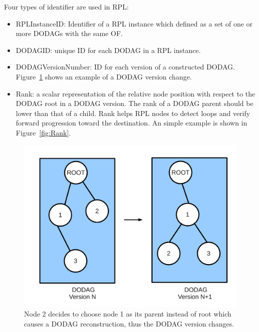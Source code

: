 Four types of identifier are used in RPL:
\begin{itemize}
\item RPLInstanceID: Identifier of a RPL instance which defined as a set of one or more DODAGs with the same OF.


\item DODAGID: unique ID for each DODAG in a RPL instance.


\item DODAGVersionNumber: ID for each version of a constructed DODAG. Figure~\ref{fig:DODAGVersion} shows an example of a DODAG version change.

\item Rank: a scalar representation of the relative node position with respect to the DODAG root in a DODAG version. 
The rank of a DODAG parent should be lower than that of a child. Rank helps RPL nodes to detect loops and verify forward progression toward the destination. An simple example is shown in Figure~\ref{fig:Rank}.
\end{itemize}

\begin{figure}[htbp]
  \begin{center}
    \leavevmode
      \includegraphics[scale=0.3]{Pics/DODAGVersion.pdf}
    \caption{Node 2 decides to choose node 1 as its parent instead of root which causes a DODAG reconstruction, thus the DODAG version changes.}
    \label{fig:DODAGVersion}
  \end{center}
\end{figure}

